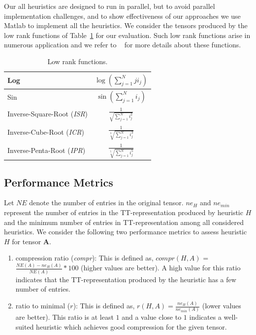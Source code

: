 \documentclass[runningheads]{llncs}
\newcommand{\tensor}[1]{\cal\textbf{#1}\xspace}
\begin{document}
Our all heuristics are designed to run in parallel, but to avoid parallel implementation challenges, and to show effectiveness of our approaches we use Matlab to implement all the heuristics. We consider the tensors produced by the low rank functions of Table~\ref{tab:lowRankFunctions} for our evaluation. Such low rank functions arise in numerous application and  we refer to ~\cite{lowRankFunctions,lowRankFunction-BM-2005,lowRankFunction-HKT-2005} for more details about these functions.

\begin{table}[htb]
	\centering
	\begin{tabular}{|l|c|}
		\hline
		Log & $\log(\sum_{j=1}^{N}j i_j)$\\ \hline
		Sin & $\sin(\sum_{j=1}^{N}i_j)$\\ \hline
		Inverse-Square-Root (\textit{ISR}) & $\frac{1}{\sqrt{\sum_{j=1}^{N}i_j^2}}$\\ \hline
		Inverse-Cube-Root (\textit{ICR}) & $\frac{1}{\sqrt[3]{\sum_{j=1}^{N}i_j^3}}$\\ \hline
		Inverse-Penta-Root (\textit{IPR}) & $\frac{1}{\sqrt[5]{\sum_{j=1}^{N}i_j^5}}$\\ \hline
	\end{tabular}
	\caption{Low rank functions.\label{tab:lowRankFunctions}}
\end{table}

\subsection{Performance Metrics}

Let $NE$ denote the number of entries in the original tensor. $ne_H$ and $ne_{min}$ represent the number of entries in the TT-representation produced by heuristic $H$ and the minimum number of entries in TT-representation among all considered heuristics. We consider the following two performance metrics to assess heuristic $H$ for tensor \tensor{A}.
\begin{enumerate}
	\item compression ratio (\textit{compr}): This is defined as, $compr(H,A)$ = $\frac{NE(A)- ne_H(A)}{NE(A)}*100$ (higher values are better). A high value for this ratio indicates that the TT-representation produced by the heuristic has a few number of entries.
	\item ratio to minimal ($r$): This is defined as, $r(H, A) = \frac{ne_H(A)}{ne_{min}(A)}$ (lower values are better). This ratio is at least $1$ and a value close to $1$ indicates a well-suited heuristic which achieves good compression for the given tensor. 
\end{enumerate}
\end{document}
